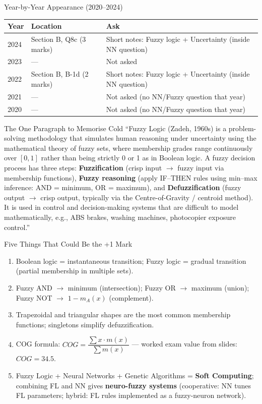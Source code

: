 \documentclass[12pt,a4paper]{article}
\begin{document}
\begin{keybox}{Year-by-Year Appearance (2020--2024)}
\begin{tabular}{lll}
\toprule
\textbf{Year} & \textbf{Location} & \textbf{Ask} \\
\midrule
2024 & Section B, Q8c (3 marks) & Short notes: Fuzzy logic + Uncertainty (inside NN question) \\
2023 & --- & Not asked \\
2022 & Section B, B-1d (2 marks) & Short notes: Fuzzy logic + Uncertainty (inside NN question) \\
2021 & --- & Not asked (no NN/Fuzzy question that year) \\
2020 & --- & Not asked (no NN/Fuzzy question that year) \\
\bottomrule
\end{tabular}
\end{keybox}

\begin{keybox}{The One Paragraph to Memorise Cold}
``Fuzzy Logic (Zadeh, 1960s) is a problem-solving methodology that simulates human reasoning under uncertainty using the mathematical theory of fuzzy sets, where membership grades range continuously over $[0,1]$ rather than being strictly 0 or 1 as in Boolean logic. A fuzzy decision process has three steps: \textbf{Fuzzification} (crisp input $\to$ fuzzy input via membership functions), \textbf{Fuzzy reasoning} (apply IF--THEN rules using min--max inference: AND = minimum, OR = maximum), and \textbf{Defuzzification} (fuzzy output $\to$ crisp output, typically via the Centre-of-Gravity / centroid method). It is used in control and decision-making systems that are difficult to model mathematically, e.g., ABS brakes, washing machines, photocopier exposure control.''
\end{keybox}

\begin{keybox}{Five Things That Could Be the +1 Mark}
\begin{enumerate}[noitemsep]
  \item Boolean logic = instantaneous transition; Fuzzy logic = gradual transition (partial membership in multiple sets).
  \item Fuzzy AND $\to$ minimum (intersection); Fuzzy OR $\to$ maximum (union); Fuzzy NOT $\to$ $1-m_A(x)$ (complement).
  \item Trapezoidal and triangular shapes are the most common membership functions; singletons simplify defuzzification.
  \item COG formula: $COG = \dfrac{\sum x \cdot m(x)}{\sum m(x)}$ --- worked exam value from slides: $COG = 34.5$.
  \item Fuzzy Logic + Neural Networks + Genetic Algorithms = \textbf{Soft Computing}; combining FL and NN gives \textbf{neuro-fuzzy systems} (cooperative: NN tunes FL parameters; hybrid: FL rules implemented as a fuzzy-neuron network).
\end{enumerate}
\end{keybox}
\end{document}
